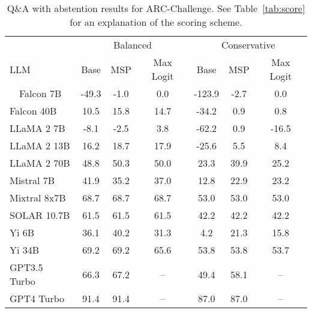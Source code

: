 \begin{table*}[h]
\centering
\caption{Q\&A with abstention results for ARC-Challenge. See Table~\ref{tab:score} for an explanation of the scoring scheme.}
\label{tab:arc_score}
\begin{tabular}{lcccccc}
\toprule
& \multicolumn{3}{c}{Balanced} & \multicolumn{3}{c}{Conservative} \\ 
LLM & Base & MSP & Max Logit & Base & MSP & Max Logit \\ 
\cmidrule(lr){1-1}\cmidrule(lr){2-4}\cmidrule(lr){5-7}\ \ 
Falcon 7B & -49.3 & -1.0 & 0.0 & -123.9 & -2.7 & 0.0\\
Falcon 40B & 10.5 & 15.8 & 14.7 & -34.2 & 0.9 & 0.8\\
LLaMA 2 7B & -8.1 & -2.5 & 3.8 & -62.2 & 0.9 & -16.5\\
LLaMA 2 13B & 16.2 & 18.7 & 17.9 & -25.6 & 5.5 & 8.4\\
LLaMA 2 70B & 48.8 & 50.3 & 50.0 & 23.3 & 39.9 & 25.2\\
Mistral 7B & 41.9 & 35.2 & 37.0 & 12.8 & 22.9 & 23.2\\
Mixtral 8x7B & 68.7 & 68.7 & 68.7 & 53.0 & 53.0 & 53.0\\
SOLAR 10.7B & 61.5 & 61.5 & 61.5 & 42.2 & 42.2 & 42.2\\
Yi 6B & 36.1 & 40.2 & 31.3 & 4.2 & 21.3 & 15.8\\
Yi 34B & 69.2 & 69.2 & 65.6 & 53.8 & 53.8 & 53.7\\
GPT3.5 Turbo & 66.3 & 67.2 & -- & 49.4 & 58.1 & --\\
GPT4 Turbo & 91.4 & 91.4 & -- & 87.0 & 87.0 & --\\
\bottomrule
\end{tabular}
\end{table*}
